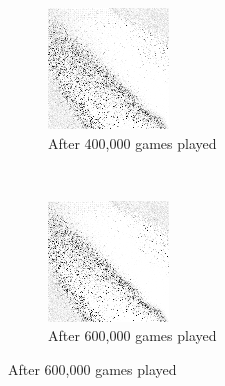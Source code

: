\begin{figure}
	\begin{subfigure}[b]{0.4\textwidth}
	\includegraphics[width=\linewidth]{images/findings/round2/flipbook/random/checkpoint_400000.png}
	\caption{After 400,000 games played}
	\end{subfigure}
	~
	\begin{subfigure}[b]{0.4\textwidth}
	\includegraphics[width=\linewidth]{images/findings/round2/flipbook/random/checkpoint_600000.png}
	\caption{After 600,000 games played}
	\end{subfigure}


\end{figure}

